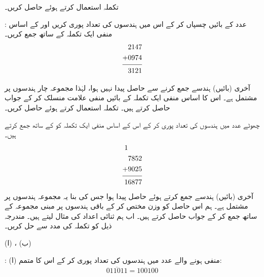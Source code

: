  تکملہ   استعمال کرتے ہوئے     حاصل کریں۔ 

:\quad
  عدد    کے بائیں  چسپاں کر کے  اس میں  ہندسوں کی تعداد  پوری کریں اور   کے اساس منفی ایک تکملہ کے ساتھ جمع کریں۔
  \begin{align*}
  \begin{split}
  2147&\\
  +0974&\\
  \noalign{\smallskip}\hline\noalign{\smallskip}
  3121&
  \end{split}
  \end{align*}

آخری  (بائیں) ہندسے جمع کرنے  سے  حاصل  پیدا نہیں ہوا، لہٰذا مجموعہ  چار ہندسوں پر مشتمل ہے۔ اس کا اساس منفی ایک تکملہ  کے بائیں منفی علامت منسلک کر کے  جواب  حاصل کرتے ہیں۔
 تکملہ   استعمال کرتے ہوئے     حاصل کریں۔ 

\quad
چھوٹے عدد  میں ہندسوں کی تعداد پوری کر کے اس کے اساس منفی ایک    تکملہ      کو  کے ساتھ جمع کرتے ہیں۔
 \begin{align*}
  \begin{split}
  1\phantom{7852}&\\
  7852&\\
  +9025&\\
  \noalign{\smallskip}\hline\noalign{\smallskip}
  16877&
  \end{split}
  \end{align*}
  آخری (بائیں) ہندسے جمع کرتے ہوئے حاصل  پیدا ہوا جس کی بنا یہ مجموعہ  ہندسوں پر مشتمل ہے۔ ہم اس حاصل  کو وزن  مختص کر کے باقی  ہندسوں پر مبنی مجموعہ  کے ساتھ جمع کر کے جواب  حاصل کرتے ہیں۔
اب ہم ثنائی اعداد کی مثال لیتے ہیں۔
 مندرجہ ذیل  کو تکملہ    کی مدد سے حل کریں۔

(ا) ،  (ب)  

:\quad
 (ا)  منفی ہونے والے عدد میں ہندسوں کی تعداد پوری کر کے اس کا  متمم:
 \begin{align*}
 \overline{011011}=100100
 \end{align*}

